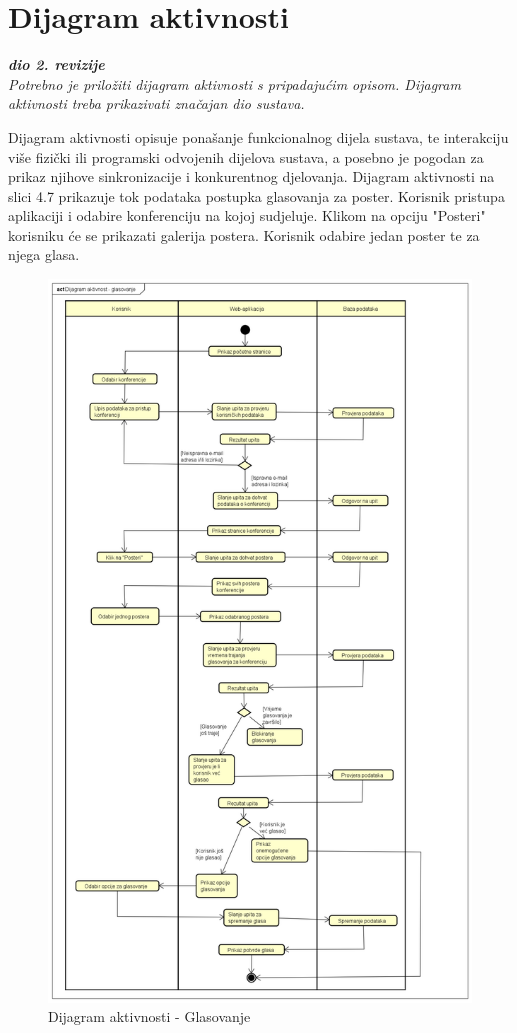 		\section{Dijagram aktivnosti}
			
			\textbf{\textit{dio 2. revizije}}\\
			
			 \textit{Potrebno je priložiti dijagram aktivnosti s pripadajućim opisom. Dijagram aktivnosti treba prikazivati značajan dio sustava.}
			 
			 \indent Dijagram aktivnosti opisuje ponašanje funkcionalnog dijela sustava, te interakciju više fizički ili programski odvojenih dijelova sustava, a posebno je pogodan za prikaz njihove sinkronizacije i konkurentnog djelovanja. Dijagram aktivnosti na slici 4.7 prikazuje tok podataka postupka glasovanja za poster. Korisnik pristupa aplikaciji i odabire konferenciju na kojoj sudjeluje. Klikom na opciju "Posteri" korisniku će se prikazati galerija postera. Korisnik odabire jedan poster te za njega glasa.    
			 
			 \begin{figure}
			 	\includegraphics[width=\linewidth]{Slike/ActivityDiagram}
			 	\caption{Dijagram aktivnosti - Glasovanje}
			 \end{figure}
			
